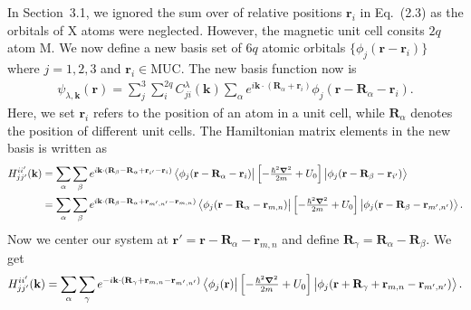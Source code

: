 In Section~3.1, we ignored the sum over of relative positions $\mathbf{r}_{i}$ in Eq.~(2.3) as the orbitals of X atoms were neglected. However, the magnetic unit cell consits $2q$ atom M. We now define a new basis set of $6q$ atomic orbitals $\{ \phi_{j}(\mathbf{r} - \mathbf{r}_{i}) \}$ where $j=1,2,3$ and $\mathbf{r}_{i} \in \text{MUC}$.
The new basis function now is
\begin{gather}
	\psi_{\lambda,\mathbf{k}}(\mathbf{r}) = \sum_{j}^{3}\sum_{i}^{2q} C_{ji}^{\lambda}(\mathbf{k}) \sum_{{\alpha}} e^{i\mathbf{k}\cdot(\mathbf{R}_{\alpha} + \mathbf{r}_{i})} \phi_{j}(\mathbf{r} - \mathbf{R}_{\alpha} - \mathbf{r}_{i}).
\end{gather}
Here, we set $\mathbf{r}_{i}$ refers to the position of an atom in a unit cell, while $\mathbf{R}_{\alpha}$ denotes the position of different unit cells.
The Hamiltonian matrix elements in the new basis is written as
\begin{equation}
	\begin{aligned}
		H_{jj'}^{ii'}(\mathbf{k})
		&= \sum_{{\alpha}}\sum_{{\beta}} e^{i \mathbf{k} \cdot (\mathbf{R}_{\beta} - \mathbf{R}_{\alpha} + \mathbf{r}_{i'} - \mathbf{r}_{i})}  \bra{\phi_{j}(\mathbf{r} - \mathbf{R}_{\alpha} - \mathbf{r}_{i})} \left[-\tfrac{\hbar^{2} \boldsymbol{\nabla}^{2}}{2m} + U_{0}\right] \ket{\phi_{j}(\mathbf{r} - \mathbf{R}_{\beta} - \mathbf{r}_{i'})} \\
		&=\sum_{{\alpha}}\sum_{{\beta}} e^{i \mathbf{k} \cdot (\mathbf{R}_{\beta} - \mathbf{R}_{\alpha} + \mathbf{r}_{m',n'} - \mathbf{r}_{m,n})}  \bra{\phi_{j}(\mathbf{r} - \mathbf{R}_{\alpha} - \mathbf{r}_{m,n})} \left[-\tfrac{\hbar^{2} \boldsymbol{\nabla}^{2}}{2m} + U_{0}\right] \ket{\phi_{j}(\mathbf{r} - \mathbf{R}_{\beta} - \mathbf{r}_{m',n'})} .
	\end{aligned}
\end{equation}
Now we center our system at $\mathbf{r}'=\mathbf{r} - \mathbf{R}_{\alpha} - \mathbf{r}_{m,n}$ and define $\mathbf{R}_{\gamma} = \mathbf{R}_{\alpha} - \mathbf{R}_{\beta}$. We get
\begin{gather}
	H_{jj'}^{ii'}(\mathbf{k})
	= \sum_{{\alpha}}\sum_{{\gamma}} e^{-i \mathbf{k} \cdot (\mathbf{R}_{\gamma} + \mathbf{r}_{m,n} - \mathbf{r}_{m',n'})}  \bra{\phi_{j}(\mathbf{r})} \left[-\tfrac{\hbar^{2} \boldsymbol{\nabla}^{2}}{2m} + U_{0}\right] \ket{\phi_{j}(\mathbf{r} + \mathbf{R}_{\gamma} + \mathbf{r}_{m,n} - \mathbf{r}_{m',n'})}.
\end{gather}
